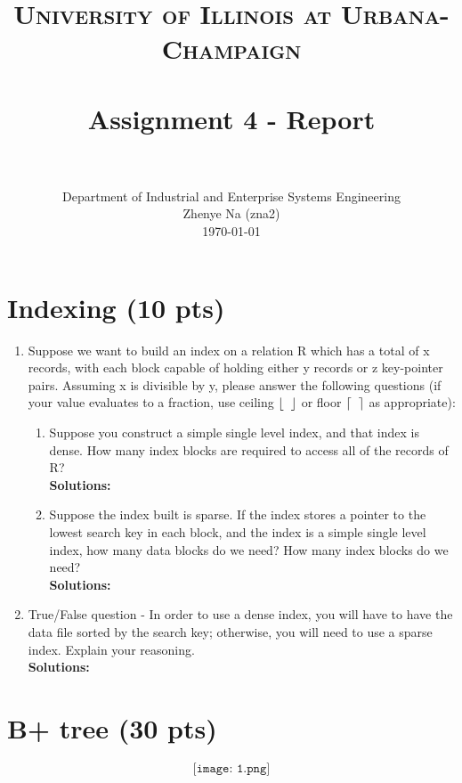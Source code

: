 \documentclass[paper=a4, fontsize=11pt]{scrartcl}
\title{
        \usefont{OT1}{bch}{b}{n}
        \normalfont \normalsize \textsc{University of Illinois at Urbana-Champaign} \\ [25pt]
        \horrule{0.5pt} \\[0.4cm]
        \huge Assignment 4 - Report \\
        \horrule{2pt} \\[0.5cm]
}
\author{
        \normalfont                                 \normalsize
        Department of Industrial and Enterprise Systems Engineering\\
        \normalsize Zhenye Na (zna2)\\[-3pt]        \normalsize
        \today
}
\date{}
\DeclarePairedDelimiter\ceil{\lceil}{\rceil}
\DeclarePairedDelimiter\floor{\lfloor}{\rfloor}
\numberwithin{equation}{section}        %
\numberwithin{figure}{section}          %
\numberwithin{table}{section}               %
\begin{document}
\maketitle

\section{Indexing (10 pts)}

\begin{enumerate}
    \item Suppose we want to build an index on a relation R which has a total of x records, with each block capable of holding either y records or z key-pointer pairs. Assuming x is divisible by y, please answer the following questions (if your value evaluates to a fraction, use ceiling $\floor*{\;\;}$ or floor $\ceil*{\;\;}$ as appropriate):\\


\begin{enumerate}
    \item Suppose you construct a simple single level index, and that index is dense. How many index blocks are required to access all of the records of R?\\
    \textbf{Solutions: }


    \item Suppose the index built is sparse. If the index stores a pointer to the lowest search key in each block, and the index is a simple single level index, how many data blocks do we need? How many index blocks do we need?\\
    \textbf{Solutions: }

\end{enumerate}



    \item True/False question - In order to use a dense index, you will have to have the data file sorted by the search key; otherwise, you will need to use a sparse index. Explain your reasoning.\\
    \textbf{Solutions: }

        
\end{enumerate}


\section{B+ tree (30 pts)}

\[
\texttt{[image: 1.png]}
\]
\end{document}
